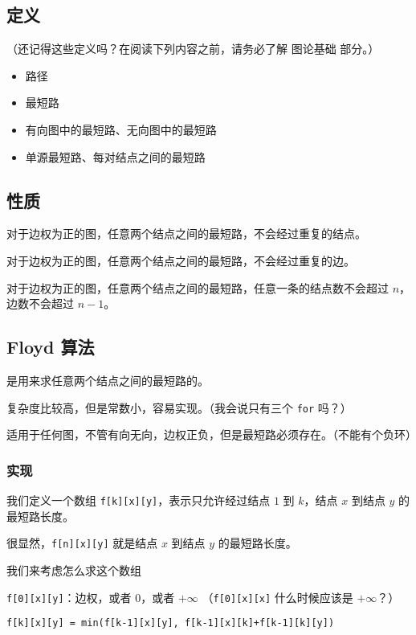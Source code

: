 
\subsection{定义}

（还记得这些定义吗？在阅读下列内容之前，请务必了解  图论基础  部分。）

\begin{itemize}
\item 路径
\item 最短路
\item 有向图中的最短路、无向图中的最短路
\item 单源最短路、每对结点之间的最短路
\end{itemize}

\subsection{性质}

对于边权为正的图，任意两个结点之间的最短路，不会经过重复的结点。

对于边权为正的图，任意两个结点之间的最短路，不会经过重复的边。

对于边权为正的图，任意两个结点之间的最短路，任意一条的结点数不会超过 $n$，边数不会超过 $n-1$。

\subsection{Floyd 算法}

是用来求任意两个结点之间的最短路的。

复杂度比较高，但是常数小，容易实现。（我会说只有三个 \texttt{for} 吗？）

适用于任何图，不管有向无向，边权正负，但是最短路必须存在。（不能有个负环）

\subsubsection{实现}

我们定义一个数组 \texttt{f[k][x][y]}，表示只允许经过结点 $1$ 到 $k$，结点 $x$ 到结点 $y$ 的最短路长度。

很显然，\texttt{f[n][x][y]} 就是结点 $x$ 到结点 $y$ 的最短路长度。

我们来考虑怎么求这个数组

\texttt{f[0][x][y]}：边权，或者 $0$，或者 $+\infty$ （\texttt{f[0][x][x]} 什么时候应该是 $+\infty$？）

\texttt{f[k][x][y] = min(f[k-1][x][y], f[k-1][x][k]+f[k-1][k][y])}

